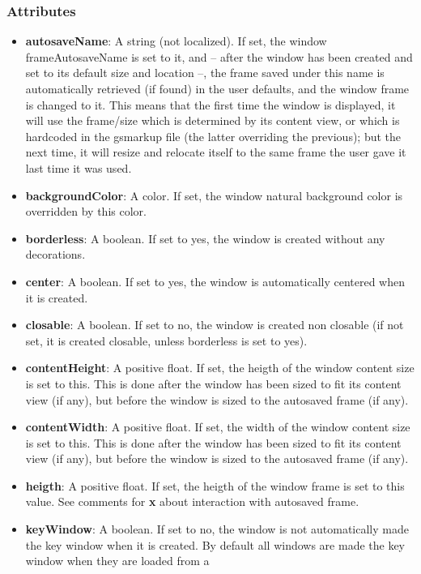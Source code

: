\subsubsection{Attributes}
\begin{itemize}
\item {\bf autosaveName}: A string (not localized).  If set, the
  window frameAutosaveName is set to it, and -- after the window has
  been created and set to its default size and location --, the frame
  saved under this name is automatically retrieved (if found) in the
  user defaults, and the window frame is changed to it.  This means
  that the first time the window is displayed, it will use the
  frame/size which is determined by its content view, or which is
  hardcoded in the gsmarkup file (the latter overriding the previous);
  but the next time, it will resize and relocate itself to the same
  frame the user gave it last time it was used.
\item {\bf backgroundColor}: A color.  If set, the window natural
  background color is overridden by this color.
\item {\bf borderless}: A boolean.  If set to yes, the window is
  created without any decorations.
\item {\bf center}: A boolean.  If set to yes, the window is
  automatically centered when it is created.
\item {\bf closable}: A boolean.  If set to no, the window is created
  non closable (if not set, it is created closable, unless borderless
  is set to yes).
\item {\bf contentHeight}: A positive float.  If set, the heigth of
  the window content size is set to this.  This is done after the
  window has been sized to fit its content view (if any), but before
  the window is sized to the autosaved frame (if any).
\item {\bf contentWidth}: A positive float.  If set, the width of the
  window content size is set to this.  This is done after the window
  has been sized to fit its content view (if any), but before the
  window is sized to the autosaved frame (if any).
\item {\bf heigth}: A positive float.  If set, the heigth of the
  window frame is set to this value.  See comments for {\bf x} about
  interaction with autosaved frame.
\item {\bf keyWindow}: A boolean.  If set to no, the window is not
  automatically made the key window when it is created.  By default
  all windows are made the key window when they are loaded from a

\end{itemize}

